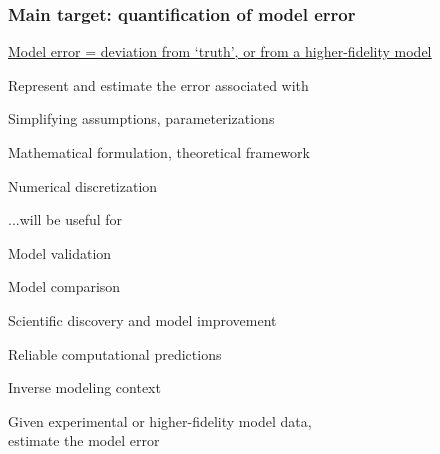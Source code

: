 \begin{frame}[t] 
\label{motivation}

\frametitle{Main target: quantification of model error}

\underline{\underline{Model error = deviation from `truth', or from a higher-fidelity model}}

\medskip
\bbi
\item Represent and estimate the error associated with 
\bgi
\item Simplifying assumptions, parameterizations
\item Mathematical formulation, theoretical framework
\item Numerical discretization 
\egi
\medskip
\item ...will be useful for 
\bgi
\item Model validation
\item Model comparison
\item Scientific discovery and model improvement 
\item Reliable computational predictions
\egi
\medskip
\item Inverse modeling context
\bgi
\item Given experimental or higher-fidelity model data,\\
estimate the model error
\egi
\ebi
\end{frame}


